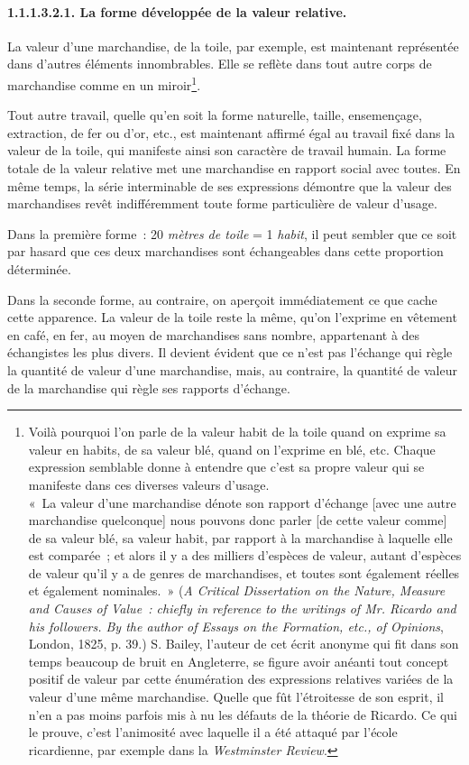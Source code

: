 \documentclass[french,twoside]{book} %
\begin{document}
\paragraph[{1.1.1.3.2.1. La forme développée de la valeur relative.}]{1.1.1.3.2.1. La forme développée de la valeur relative.}
\noindent La valeur d’une marchandise, de la toile, par exemple, est maintenant représentée dans d’autres éléments innombrables. Elle se reflète dans tout autre corps de marchandise comme en un miroir\footnote{Voilà pourquoi l’on parle de la valeur habit de la toile quand on exprime sa valeur en habits, de sa valeur blé, quand on l’exprime en blé, etc. Chaque expression semblable donne à entendre que c’est sa propre valeur qui se manifeste dans ces diverses valeurs d’usage. \\
« La valeur d’une marchandise dénote son rapport d’échange [avec une autre marchandise quelconque] nous pouvons donc parler [de cette valeur comme] de sa valeur blé, sa valeur habit, par rapport à la marchandise à laquelle elle est comparée ; et alors il y a des milliers d’espèces de valeur, autant d’espèces de valeur qu’il y a de genres de marchandises, et toutes sont également réelles et également nominales. » (\emph{A Critical Dissertation on the Nature, Measure and Causes of Value : chiefly in reference to the writings of Mr. Ricardo and his followers. By the author of Essays on the Formation, etc., of Opinions}, London, 1825, p. 39.) S. Bailey, l’auteur de cet écrit anonyme qui fit dans son temps beaucoup de bruit en Angleterre, se figure avoir anéanti tout concept positif de valeur par cette énumération des expressions relatives variées de la valeur d’une même marchandise. Quelle que fût l’étroitesse de son esprit, il n’en a pas moins parfois mis à nu les défauts de la théorie de Ricardo. Ce qui le prouve, c’est l’animosité avec laquelle il a été attaqué par l’école ricardienne, par exemple dans la \emph{Westminster Review}.}.\par
Tout autre travail, quelle qu’en soit la forme naturelle, taille, ensemençage, extraction, de fer ou d’or, etc., est maintenant affirmé égal au travail fixé dans la valeur de la toile, qui manifeste ainsi son caractère de travail humain. La forme totale de la valeur relative met une marchandise en rapport social avec toutes. En même temps, la série interminable de ses expressions démontre que la valeur des marchandises revêt indifféremment toute forme particulière de valeur d’usage.\par
Dans la première forme : 20 \emph{mètres de toile} = 1 \emph{habit}, il peut sembler que ce soit par hasard que ces deux marchandises sont échangeables dans cette proportion déterminée.\par
Dans la seconde forme, au contraire, on aperçoit immédiatement ce que cache cette apparence. La valeur de la toile reste la même, qu’on l’exprime en vêtement en café, en fer, au moyen de marchandises sans nombre, appartenant à des échangistes les plus divers. Il devient évident que ce n’est pas l’échange qui règle la quantité de valeur d’une marchandise, mais, au contraire, la quantité de valeur de la marchandise qui règle ses rapports d’échange.
\end{document}
